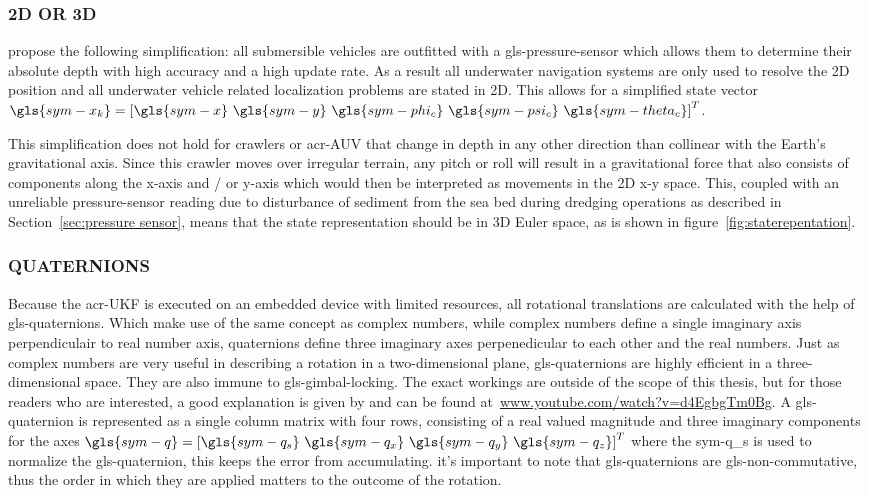 \subsubsection{2D OR 3D}

\citet{bahr_cooperative_2009} propose the following simplification: all submersible vehicles are outfitted with a 
\gls{gls-pressure-sensor} which allows them to determine their absolute depth with high accuracy and a high update 
rate. As a result all underwater navigation systems are only used to resolve the 2D position and all underwater 
vehicle related localization problems are stated in 2D. This allows for a simplified state vector \( \gls{sym-x_k} = 
\left[\gls{sym-x} ~\gls{sym-y} ~\gls{sym-phi_c} ~\gls{sym-psi_c} ~\gls{sym-theta_c}\right]^T \).

This simplification does not hold for crawlers or \gls{acr-AUV} that change in depth in any other direction than
collinear with the Earth's gravitational axis. Since this crawler moves over irregular terrain, any pitch or roll will
result in a gravitational force that also consists of components along the x-axis and / or y-axis which would then be
interpreted as movements in the 2D x-y space. This, coupled with an unreliable pressure-sensor reading due to
disturbance of sediment from the sea bed during dredging operations as described in Section~\ref{sec:pressure sensor},
means that the state representation should be in 3D Euler space, as is shown in figure~\ref{fig:staterepentation}.

\subsubsection{QUATERNIONS}

Because the \gls{acr-UKF} is executed on an embedded device with limited resources, all rotational translations are
calculated with the help of \glspl{gls-quaternion}. Which make use of the same concept as complex numbers, while 
complex numbers define a single imaginary axis perpendiculair to real number axis, quaternions define three imaginary
axes perpenedicular to each other and the real numbers. Just as complex numbers are very useful in describing a rotation in a
two-dimensional plane, \gls{gls-quaternion}s are highly efficient in a three-dimensional space. They are also immune to
\gls{gls-gimbal-lock}ing. The exact workings are outside of the scope of this thesis, but for those readers who are
interested, a good explanation is given by \citet{3blue1brown_quaternions_2018} and can be found
at~\url{www.youtube.com/watch?v=d4EgbgTm0Bg}. A \gls{gls-quaternion} is represented as a single column matrix with four
rows, consisting of a real valued magnitude and three imaginary components for the axes \(\gls{sym-q} =
\left[\gls{sym-q_s} ~\gls{sym-q_x} ~\gls{sym-q_y}  ~\gls{sym-q_z} \right]^T \) where the \gls{sym-q_s} is used to
normalize the \gls{gls-quaternion}, this keeps the error from accumulating. it's important to note that
\gls{gls-quaternion}s are \gls{gls-non-commutative}, thus the order in which they are applied matters to the outcome of
the rotation.

